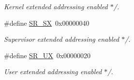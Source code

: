 \begin{DoxyCompactItemize}
\begin{DoxyCompactList}\small\item\em Kernel extended addressing enabled $\ast$/. \end{DoxyCompactList}\item 
\mbox{\label{group__mips__regs_ga3d8d231eca1e567ae8186ed28153a633}} 
\#define \mbox{\hyperlink{group__mips__regs_ga3d8d231eca1e567ae8186ed28153a633}{S\+R\+\_\+\+SX}}~0x00000040
\begin{DoxyCompactList}\small\item\em Supervisor extended addressing enabled $\ast$/. \end{DoxyCompactList}\item 
\mbox{\label{group__mips__regs_gaae4290665a4c2892503ba18a4b0fd863}} 
\#define \mbox{\hyperlink{group__mips__regs_gaae4290665a4c2892503ba18a4b0fd863}{S\+R\+\_\+\+UX}}~0x00000020
\begin{DoxyCompactList}\small\item\em User extended addressing enabled $\ast$/. \end{DoxyCompactList}\end{DoxyCompactItemize}
